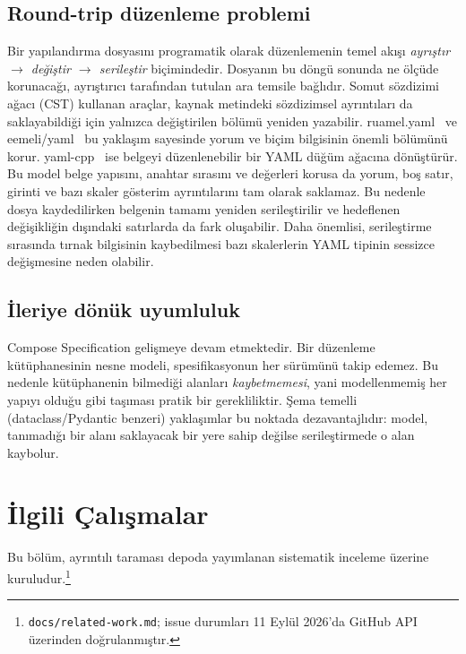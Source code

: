 \documentclass[conference]{IEEEtran}
\begin{document}
\subsection{Round-trip düzenleme problemi}
Bir yapılandırma dosyasını programatik olarak düzenlemenin temel akışı
\emph{ayrıştır $\rightarrow$ değiştir $\rightarrow$ serileştir} biçimindedir.
Dosyanın bu döngü sonunda ne ölçüde korunacağı, ayrıştırıcı tarafından
tutulan ara temsile bağlıdır. Somut sözdizimi ağacı (CST) kullanan araçlar,
kaynak metindeki sözdizimsel ayrıntıları da saklayabildiği için yalnızca
değiştirilen bölümü yeniden yazabilir. ruamel.yaml~\cite{ruamelyaml} ve
eemeli/yaml~\cite{eemeliyaml} bu yaklaşım sayesinde yorum ve biçim
bilgisinin önemli bölümünü korur. yaml-cpp~\cite{yamlcpp} ise belgeyi
düzenlenebilir bir YAML düğüm ağacına dönüştürür. Bu model belge yapısını,
anahtar sırasını ve değerleri korusa da yorum, boş satır, girinti ve bazı
skaler gösterim ayrıntılarını tam olarak saklamaz. Bu nedenle dosya
kaydedilirken belgenin tamamı yeniden serileştirilir ve hedeflenen
değişikliğin dışındaki satırlarda da fark oluşabilir. Daha önemlisi,
serileştirme sırasında tırnak bilgisinin kaybedilmesi bazı skalerlerin YAML
tipinin sessizce değişmesine neden olabilir.

\subsection{İleriye dönük uyumluluk}
Compose Specification gelişmeye devam etmektedir. Bir düzenleme
kütüphanesinin nesne modeli, spesifikasyonun her sürümünü takip edemez.
Bu nedenle kütüphanenin bilmediği alanları \emph{kaybetmemesi}, yani
modellenmemiş her yapıyı olduğu gibi taşıması pratik bir gerekliliktir.
Şema temelli (dataclass/Pydantic benzeri) yaklaşımlar bu noktada
dezavantajlıdır: model, tanımadığı bir alanı saklayacak bir yere sahip
değilse serileştirmede o alan kaybolur.

\section{İlgili Çalışmalar}
\label{sec:ilgili-calismalar}

Bu bölüm, ayrıntılı taraması depoda yayımlanan sistematik inceleme
üzerine kuruludur.\footnote{\texttt{docs/related-work.md}; issue durumları
11 Eylül 2026'da GitHub API üzerinden doğrulanmıştır.}
\end{document}

